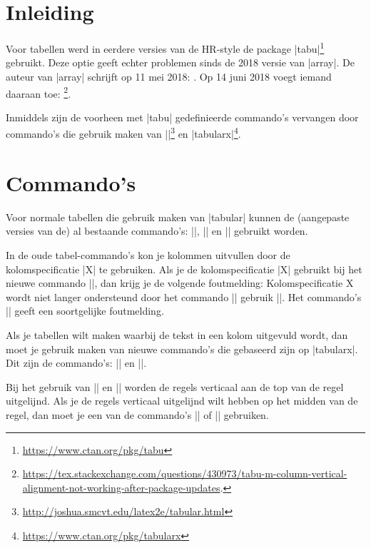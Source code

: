 \begin{llstShortInline}
	\tableofcontents
	
	\section*{Inleiding}
	Voor tabellen werd in eerdere versies van de HR-style de package |tabu|\footnote{\url{https://www.ctan.org/pkg/tabu}} gebruikt.
	Deze optie geeft echter problemen sinds de 2018 versie van |array|. De auteur van |array| schrijft op 11 mei 2018: . Op 14 juni 2018 voegt iemand daaraan toe: \footnote{
		\url{https://tex.stackexchange.com/questions/430973/tabu-m-column-vertical-alignment-not-working-after-package-updates}.
	}.
	
	Inmiddels zijn de voorheen met |tabu| gedefinieerde commando's vervangen door commando's die gebruik maken van |\tabular|\footnote{\url{http://joshua.smcvt.edu/latex2e/tabular.html}} en |tabularx|\footnote{\url{https://www.ctan.org/pkg/tabularx}}.
	
	\section{Commando's}
	Voor normale tabellen die gebruik maken van |tabular| kunnen de (aangepaste versies van de) al bestaande commando's:
	|\tabel|, |\tabelmaxpaginabreedgeschaald| en |\langetabel| gebruikt worden.
	
	In de oude tabel-commando's kon je kolommen uitvullen door de kolomspecificatie |X| te gebruiken.
	Als je de kolomspecificatie |X| gebruikt bij het nieuwe commando |\tabel|, dan krijg je de volgende foutmelding: Kolomspecificatie X wordt niet langer ondersteund door het commando |\tabel| gebruik |\tabelX|.
	Het commando's |\langetabel| geeft een soortgelijke foutmelding.
		
	Als je tabellen wilt maken waarbij de tekst in een kolom uitgevuld wordt, dan moet je gebruik maken van nieuwe commando's die gebaseerd zijn op |tabularx|. 
	Dit zijn de commando's:
	|\tabelX| en |\langetabelX|.

	Bij het gebruik van |\tabelX| en |\langetabelX| worden de regels verticaal aan de top van de regel uitgelijnd.
	Als je de regels verticaal uitgelijnd wilt hebben op het midden van de regel, dan moet je een van de commando's |\tabelXm| of |\langetabelXm| gebruiken.
	

\end{llstShortInline}
